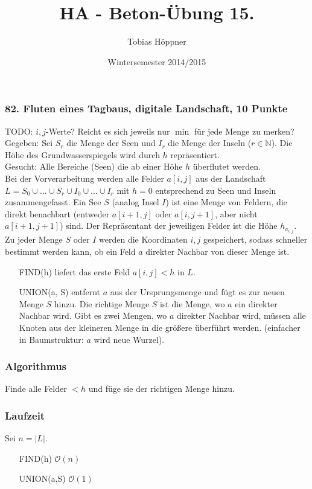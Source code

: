 \documentclass[ngerman,a4paper]{report}
\author{Tobias Höppner}
\title{HA - Beton-Übung 15.}
\date{Wintersemester 2014/2015}
\renewcommand{\maketitle}{}
\begin{document}
 
\maketitle 

\subsubsection*{82. Fluten eines Tagbaus, digitale Landschaft, 10 Punkte}

TODO: $i,j$-Werte? Reicht es sich jeweils nur $\min$ für jede Menge zu merken?\\

Gegeben: Sei $S_r$ die Menge der Seen und $I_r$ die Menge der Inseln ($r \in \mathbb{N}$). Die Höhe des Grundwasserspiegels wird durch $h$ repräsentiert.\\
Gesucht: Alle Bereiche (Seen) die ab einer Höhe $h$ überflutet werden.\\
Bei der Vorverarbeitung werden alle Felder $a[i,j]$ aus der Landschaft $L = S_0 \cup ... \cup S_r \cup I_0 \cup ... \cup I_r$ mit $h=0$ entsprechend zu Seen und Inseln zusammengefasst. Ein See $S$ (analog Insel $I$) ist eine Menge von Feldern, die direkt benachbart (entweder $a[i+1,j]$ oder $a[i,j+1]$, aber nicht $a[i+1,j+1]$) sind. Der Repräsentant der jeweiligen Felder ist die Höhe $h_{a_{i,j}}$. Zu jeder Menge $S$ oder $I$ werden die Koordinaten $i,j$ gespeichert, sodass schneller bestimmt werden kann, ob ein Feld $a$ direkter Nachbar von dieser Menge ist.\\

\begin{enumerate}
\item[FIND(h)] liefert das erste Feld $a[i,j] <h$ in $L$.\\
\item[UNION(a, S)] entfernt $a$ aus der Ursprungsmenge und fügt es zur neuen Menge $S$ hinzu. Die richtige Menge $S$ ist die Menge, wo $a$ ein direkter Nachbar wird. Gibt es zwei Mengen, wo $a$ direkter Nachbar wird, müssen alle Knoten aus der kleineren Menge in die größere überführt werden. (einfacher in Baumstruktur: $a$ wird neue Wurzel).
\end{enumerate}
\subsubsection*{Algorithmus}
Finde alle Felder $<h$ und füge sie der richtigen Menge hinzu.\\

\subsubsection*{Laufzeit}
Sei $n=|L|$.
\begin{enumerate}
\item[FIND(h)] $\mathcal{O}(n)$
\item[UNION(a,S)] $\mathcal{O}(1)$
\end{enumerate}
\end{document}
